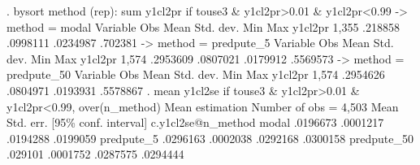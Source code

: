 . bysort method (rep): sum y1cl2pr if touse3 \& y1cl2pr>0.01 \& y1cl2pr<0.99
{\smallskip}
-> method = modal
{\smallskip}
    Variable {\VBAR}        Obs        Mean    Std. dev.       Min        Max
     y1cl2pr {\VBAR}      1,355     .218858    .0998111   .0234987    .702381
{\smallskip}
-> method = predpute_5
{\smallskip}
    Variable {\VBAR}        Obs        Mean    Std. dev.       Min        Max
     y1cl2pr {\VBAR}      1,574    .2953609    .0807021   .0179912   .5569573
{\smallskip}
-> method = predpute_50
{\smallskip}
    Variable {\VBAR}        Obs        Mean    Std. dev.       Min        Max
     y1cl2pr {\VBAR}      1,574    .2954626    .0804971   .0193931   .5578867
{\smallskip}
{\smallskip}
. mean y1cl2se if touse3 \& y1cl2pr>0.01 \& y1cl2pr<0.99, over(n_method)
{\smallskip}
Mean estimation                                Number of obs = 4,503
{\smallskip}
                   {\VBAR}       Mean   Std. err.     [95\% conf. interval]
c.y1cl2se@n_method {\VBAR}
            modal  {\VBAR}   .0196673   .0001217      .0194288    .0199059
       predpute_5  {\VBAR}   .0296163   .0002038      .0292168    .0300158
      predpute_50  {\VBAR}    .029101   .0001752      .0287575    .0294444
